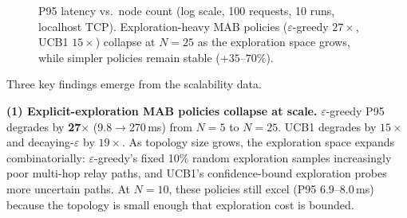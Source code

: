 \documentclass[sigconf,nonacm]{acmart}
\begin{document}
\begin{figure}[t]
\centering
{}
\caption{P95 latency vs.\ node count (log scale, 100 requests, 10 runs, localhost TCP). Exploration-heavy MAB policies ($\varepsilon$-greedy $27{\times}$, UCB1 $15{\times}$) collapse at $N{=}25$ as the exploration space grows, while simpler policies remain stable ($+35$--$70\%$).}
\label{fig:scalability}
\end{figure}

Three key findings emerge from the scalability data.

\textbf{(1) Explicit-exploration MAB policies collapse at scale.} $\varepsilon$-greedy P95 degrades by \textbf{27$\times$} (9.8$\to$270\,ms) from $N{=}5$ to $N{=}25$. UCB1 degrades by $15\times$ and decaying-$\varepsilon$ by $19\times$. As topology size grows, the exploration space expands combinatorially: $\varepsilon$-greedy's fixed 10\% random exploration samples increasingly poor multi-hop relay paths, and UCB1's confidence-bound exploration probes more uncertain paths. At $N{=}10$, these policies still excel (P95 6.9--8.0\,ms) because the topology is small enough that exploration cost is bounded.
\end{document}
